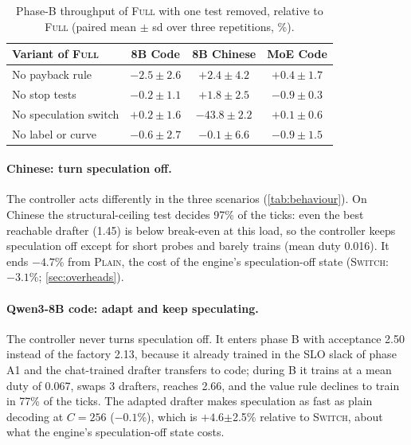 \documentclass{article}
\newcommand{\pol}[1]{\textsc{#1}}
\begin{document}
\begin{table}[t]
\caption{Phase-B throughput of \pol{Full} with one test removed, relative to \pol{Full} (paired mean $\pm$ sd over three repetitions, \%).}
\label{tab:ablate}
\centering\small\setlength{\tabcolsep}{4pt}

\begingroup
\renewcommand{\arraystretch}{1.20}
\setlength{\tabcolsep}{5pt}

\begin{tabular}{@{}lccc@{}}
\toprule
\textbf{Variant of \pol{Full}} &
\textbf{8B Code} &
\textbf{8B Chinese} &
\textbf{MoE Code} \\
\midrule

\rowcolor{tabGroup}
No payback rule
& $-2.5\pm2.6$
& $+2.4\pm4.2$
& $+0.4\pm1.7$ \\

\rowcolor{tabGroup}
No stop tests
& $-0.2\pm1.1$
& $+1.8\pm2.5$
& $-0.9\pm0.3$ \\

\addlinespace[3pt]

No speculation switch
& $+0.2\pm1.6$
& \cellcolor{tabDrop}
  $\boldsymbol{-43.8\pm2.2}$
& $+0.1\pm0.6$ \\

\addlinespace[3pt]

No label or curve
& $-0.6\pm2.7$
& $-0.1\pm6.6$
& $-0.9\pm1.5$ \\

\bottomrule
\end{tabular}
\endgroup

\end{table}

\paragraph{Chinese: turn speculation off.} The controller acts differently in the three scenarios (\cref{tab:behaviour}). On Chinese the structural-ceiling test decides 97\% of the ticks: even the best reachable drafter (1.45) is below break-even at this load, so the controller keeps speculation off except for short probes and barely trains (mean duty 0.016). It ends $-4.7$\% from \pol{Plain}, the cost of the engine's speculation-off state (\pol{Switch}: $-3.1$\%; \cref{sec:overheads}).

\paragraph{Qwen3-8B code: adapt and keep speculating.} The controller never turns speculation off. It enters phase B with acceptance 2.50 instead of the factory 2.13, because it already trained in the SLO slack of phase A1 and the chat-trained drafter transfers to code; during B it trains at a mean duty of 0.067, swaps 3 drafters, reaches 2.66, and the value rule declines to train in 77\% of the ticks. The adapted drafter makes speculation as fast as plain decoding at $C{=}256$ ($-0.1$\%), which is $+4.6$$\pm$2.5\% relative to \pol{Switch}, about what the engine's speculation-off state costs.
\end{document}
